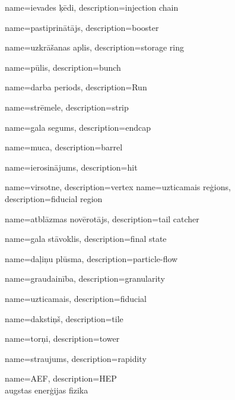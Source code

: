{
        name=ievades ķēdi,
        description={injection chain}
}

{
        name=pastiprinātājs,
        description={booster}
}

{
        name=uzkrāšanas aplis,
        description={storage ring}
}

{
        name=pūlis,
        description={bunch}
}

{
        name=darba periods,
        description={Run}
}

{
        name=strēmele,
        description={strip}
}

{
        name=gala segums,
        description={endcap}
}

{
        name=muca,
        description={barrel}
}

{
        name=ierosinājums,
        description={hit}
}

{
        name=virsotne,
        description={vertex}
}
{
        name=uzticamais reģions,
        description={fiducial region}
}

{
        name=atblāzmas novērotājs,
        description={tail catcher}
}


{
        name=gala stāvoklis,
        description={final state}
}

{
        name=daļiņu plūsma,
        description={particle-flow}
}

{
        name=graudainība,
        description={granularity}
}

{
        name=uzticamais,
        description={fiducial}
}


{
        name=dakstiņš,
        description={tile}
}


{
        name=torņi,
        description={tower}
}


{
        name=straujums,
        description={rapidity}
}

{
        name=AEF,
        description={HEP\\
        augstas enerģijas fizika}
}

